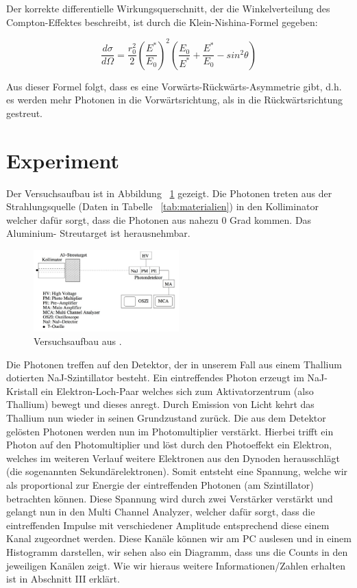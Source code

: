 \documentclass[aps,twocolumn,secnumarabic,nobalancelastpage,amsmath,amssymb,
nofootinbib,superscriptaddress]{revtex4-1}
\begin{document}
Der korrekte differentielle Wirkungsquerschnitt, der die Winkelverteilung des
Compton-Effektes beschreibt, ist durch die Klein-Nishina-Formel gegeben:

  \begin{equation}
    \frac{d \sigma}{d \Omega} = \frac{r_0^2}{2} \left( \frac{E^*}{E_0} \right)^2
    \left( \frac{E_0}{E^*} + \frac{E^*}{E_0} - sin^2 \theta    \right)
    \label{eq:kleinnishina}
  \end{equation}

Aus dieser Formel folgt, dass es eine Vorwärts-Rückwärts-Asymmetrie gibt, d.h.
es werden mehr Photonen in die Vorwärtsrichtung, als in die Rückwärtsrichtung
gestreut.


\section{Experiment}
Der Versuchsaufbau ist in Abbildung ~\ref{fig:aufbau} gezeigt. Die Photonen treten
aus der Strahlungsquelle (Daten in Tabelle ~\ref{tab:materialien}) in den Kolliminator
welcher dafür sorgt, dass die Photonen aus nahezu 0 Grad kommen. Das Aluminium-
Streutarget ist herausnehmbar.

\begin{figure}[h]
  \centering
  \includegraphics[width=0.5\textwidth]{aufbau.jpeg}
  \caption{\label{fig:aufbau} Versuchsaufbau aus \cite{skript07}.}
\end{figure}

Die Photonen treffen auf den Detektor, der in unserem
Fall aus einem Thallium dotierten NaJ-Szintillator besteht. Ein eintreffendes Photon
erzeugt im NaJ-Kristall ein Elektron-Loch-Paar welches sich zum Aktivatorzentrum
(also Thallium) bewegt und dieses anregt. Durch Emission von Licht kehrt das Thallium
nun wieder in seinen Grundzustand zurück. Die aus dem Detektor gelösten Photonen
werden nun im Photomultiplier verstärkt. Hierbei trifft ein Photon auf den
Photomultiplier und löst durch den Photoeffekt ein Elektron, welches im weiteren
Verlauf weitere Elektronen aus den Dynoden herausschlägt (die sogenannten
Sekundärelektronen). Somit entsteht eine Spannung, welche wir als proportional zur
Energie der eintreffenden Photonen (am Szintillator) betrachten können. Diese
Spannung wird durch zwei Verstärker verstärkt und gelangt nun in den Multi Channel
Analyzer, welcher dafür sorgt, dass die eintreffenden Impulse mit verschiedener
Amplitude entsprechend diese einem Kanal zugeordnet werden. Diese Kanäle können
wir am PC auslesen und in einem Histogramm darstellen, wir sehen also ein Diagramm,
dass uns die Counts in den jeweiligen Kanälen zeigt. Wie wir hieraus weitere
Informationen/Zahlen erhalten ist in Abschnitt III erklärt.
\end{document}
